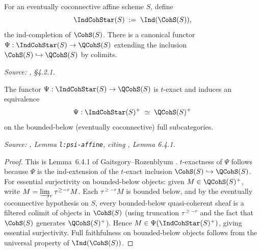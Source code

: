 \begin{definition}
  \label{def:indcoh-star-S}
  For an eventually coconnective affine scheme $S$, define
  \[
    \IndCohStar(S) \;:=\; \Ind(\CohS(S)),
  \]
  the ind-completion of $\CohS(S)$. There is a canonical functor
  $\Psi : \IndCohStar(S) \to \QCohS(S)$ extending the inclusion
  $\CohS(S) \hookrightarrow \QCohS(S)$ by colimits.

  \textit{Source: \cite{hilburn-raskin}, \S4.2.1.}
\end{definition}

\begin{lemma}
  \label{lem:psi-equiv}
  The functor $\Psi : \IndCohStar(S) \to \QCohS(S)$ is $t$-exact and induces
  an equivalence
  \[
    \Psi : \IndCohStar(S)^+ \;\simeq\; \QCohS(S)^+
  \]
  on the bounded-below (eventually coconnective) full subcategories.

  \textit{Source: \cite{hilburn-raskin}, Lemma \texttt{l:psi-affine}, citing \cite{gaitsgory-rozenblyum-methods}, Lemma 6.4.1.}
\end{lemma}

\begin{proof}
  This is Lemma~6.4.1 of Gaitsgory--Rozenblyum \cite{gaitsgory-rozenblyum-methods}.
  $t$-exactness of $\Psi$ follows because $\Psi$ is the ind-extension of
  the $t$-exact inclusion $\CohS(S) \hookrightarrow \QCohS(S)$.
  For essential surjectivity on bounded-below objects: given
  $M \in \QCohS(S)^+$, write $M = \varinjlim_r \tau^{\geq -r} M$.
  Each $\tau^{\geq -r} M$ is bounded below, and by the eventually
  coconnective hypothesis on $S$, every bounded-below quasi-coherent
  sheaf is a filtered colimit of objects in $\CohS(S)$ (using
  truncation $\tau^{\geq -r}$ and the fact that $\CohS(S)$ generates
  $\QCohS(S)^+$). Hence $M \in \Psi(\IndCohStar(S)^+)$, giving
  essential surjectivity. Full faithfulness on bounded-below objects
  follows from the universal property of $\Ind(\CohS(S))$.
\end{proof}

